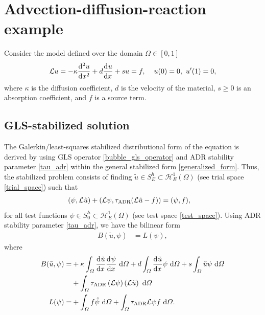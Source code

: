 \section{Advection-diffusion-reaction example}

Consider the model defined over the domain $\Omega \in [0,1]$
\begin{align}
  \label{bubble_example_2}
  \Lu u = -\kappa \totder[2]{u}{x} + d \totder{u}{x} + su = f, \hspace{4mm} u(0) = 0,\ u'(1) = 0,
\end{align}
where $\kappa$ is the diffusion coefficient, $d$ is the velocity of the material, $s \geq 0$ is an absorption coefficient, and $f$ is a source term.

\subsection{GLS-stabilized solution}

The Galerkin/least-squares  stabilized distributional form of the equation is derived by using GLS operator \cref{bubble_gls_operator} and ADR stability parameter \cref{tau_adr} within the general stabilized form \cref{generalized_form}.  Thus, the stabilized problem consists of finding $\tilde{u} \in S_E^h \subset \mathcal{H}_E^1(\Omega)$ (see trial space \cref{trial_space}) such that
\begin{align*}
  (\psi, \mathcal{L} \tilde{u}) + (\mathcal{L} \psi, \tau_{\text{ADR}} (\mathcal{L} \tilde{u} - f)) &= (\psi, f),
\end{align*}
for all test functions $\psi \in S_0^h \subset \mathcal{H}_E^1(\Omega)$ (see test space \cref{test_space}).  Using ADR stability parameter \cref{tau_adr}, we have the bilinear form
\begin{align*}
  B(\tilde{u},\psi) &= L(\psi),
\end{align*}
where
\begin{align*}
  B(\tilde{u}, \psi) = &+ \kappa \int_{\varOmega} \frac{\mathrm{d}{^{}} \tilde{u}}{\mathrm{d} x{^{}} } \frac{\mathrm{d}{^{}} \psi}{\mathrm{d} x{^{}} } \ \mathrm{d}\varOmega + d \int_{\varOmega} \frac{\mathrm{d}{^{}} \tilde{u}}{\mathrm{d} x{^{}} } \psi \ \mathrm{d}\varOmega + s\int_{\varOmega} \tilde{u} \psi \ \mathrm{d}\varOmega \\
  &+ \int_{\varOmega} \tau_{\text{ADR}} \left( \mathcal{L} \psi \right) \left( \mathcal{L} \tilde{u} \right) \ \mathrm{d}\varOmega \\
  L(\psi) = &+ \int_{\varOmega} f \hat{\psi} \ \mathrm{d}\varOmega + \int_{\varOmega} \tau_{\text{ADR}} \mathcal{L} \psi f \ \mathrm{d}\varOmega.
\end{align*}

